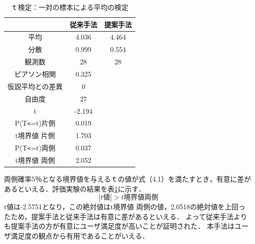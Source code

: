 \documentclass[11pt,titlepage,uplatex]{ujreport}
\begin{document}
\begin{table}[tbh]
  \caption{ｔ検定：一対の標本による平均の検定}
  \label{結果}
  \centering
    \begin{tabular}{ccc}
      \hline
        & 従来手法 & 提案手法\\
      \hline \hline
      平均 & 4.036 & 4.464\\
      分散 & 0.999 & 0.554\\
      観測数 & 28 & 28\\
      ピアソン相関 & 0.325 & \\
      仮説平均との差異 & 0 & \\
      自由度 & 27 & \\
      t & -2.194 & \\
      P(T\verb~<~=t)片側 & 0.019 & \\
      t境界値 片側 & 1.703 & \\
      P(T\verb~<~=t)両側 & 0.037 & \\
      t境界値 両側 & 2.052 & \\
      \hline
    \end{tabular}
\end{table}
\noindent
両側確率5％となる境界値を与えるｔの値が式（4.1）を満たすとき，有意に差が
あるといえる．評価実験の結果を表\ref{結果}に示す．
\begin{equation}
|t値| > t境界値 両側
\end{equation}
t値は-2.5751となり，この絶対値はt境界値 両側の値，2.0518の絶対値を上回っ
たため，提案手法と従来手法は有意に差があるといえる．
よって従来手法よりも提案手法の方が有意にユーザ満足度が高いことが証明された．
本手法はユーザ満足度の観点から有用であることがいえる．
\end{document}
